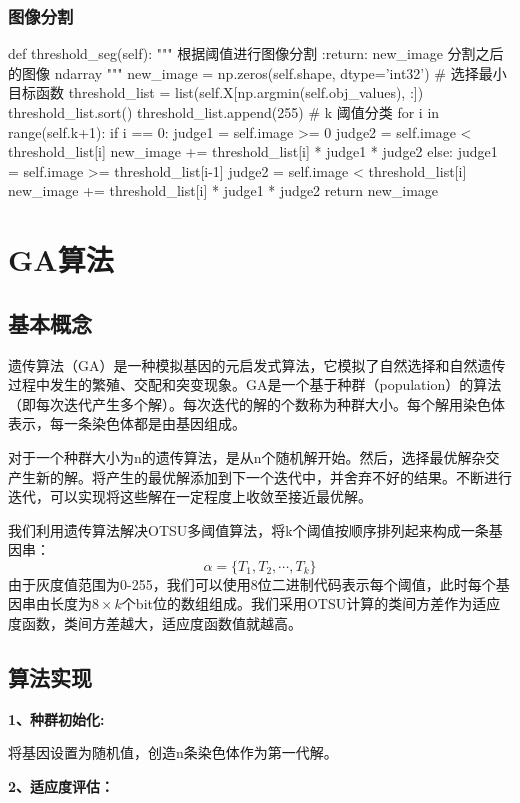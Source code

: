 \documentclass{article}
\begin{document}
\subsubsection{图像分割}
\begin{python}
	def threshold_seg(self):
		 """
		 根据阈值进行图像分割
		 :return: new_image 分割之后的图像 ndarray
		 """
		 new_image = np.zeros(self.shape, dtype='int32')
		 # 选择最小目标函数
		 threshold_list = list(self.X[np.argmin(self.obj_values), :])
		 threshold_list.sort()
		 threshold_list.append(255)
		 # k 阈值分类
		 for i in range(self.k+1):
		 	 if i == 0:
		 	 	 judge1 = self.image >= 0
		 	 	 judge2 = self.image < threshold_list[i]
		 	 	 new_image += threshold_list[i] * judge1 * judge2
	  		else:
		 	 	 judge1 = self.image >= threshold_list[i-1]
		 	 	 judge2 = self.image < threshold_list[i]
		 	 	 new_image += threshold_list[i] * judge1 * judge2
		 return new_image
\end{python}

\section{GA算法}

\subsection{基本概念}
遗传算法（GA）是一种模拟基因的元启发式算法，它模拟了自然选择和自然遗传过程中发生的繁殖、交配和突变现象。GA是一个基于种群（population）的算法（即每次迭代产生多个解）。每次迭代的解的个数称为种群大小。每个解用染色体表示，每一条染色体都是由基因组成。

对于一个种群大小为n的遗传算法，是从n个随机解开始。然后，选择最优解杂交产生新的解。将产生的最优解添加到下一个迭代中，并舍弃不好的结果。不断进行迭代，可以实现将这些解在一定程度上收敛至接近最优解。

我们利用遗传算法解决OTSU多阈值算法，将k个阈值按顺序排列起来构成一条基因串：
$$\alpha=\{T_1,T_2,\cdots,T_k\}$$
由于灰度值范围为0-255，我们可以使用8位二进制代码表示每个阈值，此时每个基因串由长度为$8\times k$个bit位的数组组成。我们采用OTSU计算的类间方差作为适应度函数，类间方差越大，适应度函数值就越高。
\subsection{算法实现}
\textbf{1、种群初始化:}

将基因设置为随机值，创造n条染色体作为第一代解。

\textbf{2、适应度评估：}
\end{document}
